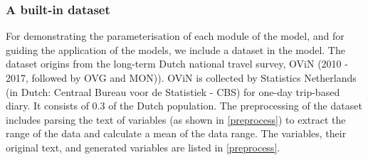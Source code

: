 \documentclass[]{article}
\begin{document}
\begin{table}[]
\caption{An example of activity schedules. h2w means "home to work", and w2h means "work to home". The "bicycle" indicates the transportation mean, which is generated from the activity model. The integer part indicates hours, and the digits indicate minutes in percentage, e.g., 9.89 is at around 9:54 am (54 = 89*0.6).}
\label{tab:sche}
\end{table}
 
 


\subsubsection{A built-in dataset}
\label{sec:data} 
For demonstrating the parameterisation of each module of the model, and for guiding the application of the models, we include a dataset in the model. The dataset origins from the long-term Dutch national travel survey, OViN (2010 - 2017, followed by OVG and MON)). OViN is collected by Statistics Netherlands (in Dutch: Centraal Bureau voor de Statistiek - CBS) for one-day trip-based diary. It consists of 0.3 of the Dutch population. The preprocessing of the dataset includes parsing the text of variables (as shown in \cref{preprocess}) to extract the range of the data and calculate a mean of the data range. The variables, their original text, and generated variables are listed in \cref{preprocess}.
 
\end{document}
